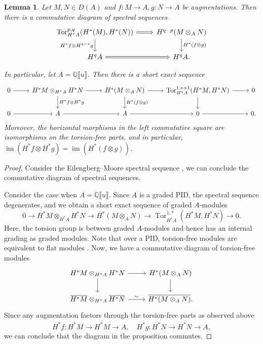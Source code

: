 \documentclass[11pt]{amsart}
\numberwithin{equation}{section}
\theoremstyle{plain}
\newtheorem{Lemma}[lemma]{Lemma}
\theoremstyle{definition}
\theoremstyle{remark}
\newcommand{\bQ} { {\mathbb{Q}}}
\newcommand{\fpw}[1]{{\llbracket #1\rrbracket}}
\newcommand\im{ {\operatorname{im}} }
\newcommand\Tor{\operatorname{Tor}}
\begin{document}
\begin{Lemma}\label{prop:eilenberg-moore}Let $M, N \in D(A)$ and $f: M \to A, g: N \to A$ be augmentations. Then there is a commutative diagram of spectral sequences
\[\begin{tikzcd}
\Tor^{p,q}_{H^*A}(H^*(M), H^*(N)) \ar[r,Rightarrow] \ar[d, "H^*f \otimes H^{q-*}g" left] & H^{q-p}(M \otimes_A N) \ar[d, "H^*(f \otimes g)"] \\
H^qA \ar[r, Rightarrow] & H^{q}A.
\end{tikzcd}\]

In particular, let $A=\bQ\fpw{u}$. Then there is a short exact sequence
\[\begin{tikzcd}
0 \ar[r] & H^*M \otimes_{H^*A} H^*N \ar[r] \ar[d,"H^*f \otimes H^*g"] & H^*(M \otimes_A N) \ar[r] \ar[d,"H^*(f \otimes g)"] & \Tor_{H^*A}^{1,*+1}(H^*M, H^*N) \ar[r] \ar[d] & 0\\
0 \ar[r] & A \ar[r] & A \ar[r] & 0 \ar[r] & 0.
\end{tikzcd}\]
Moreover, the horizontal morphisms in the left commutative square are isomorphisms on the torsion-free parts, and in particular, $\im(H^*f \otimes H^*g) = \im(H^*(f \otimes g))$.
\end{Lemma}
\begin{proof}
Consider the Eilengberg--Moore spectral sequence \cite[Chapter IV Theorem 6.1]{EKMM}, we can conclude the commutative diagram of spectral sequences. 

Consider the case when $A = \bQ\fpw{u}$. Since $A$ is a graded PID, the spectral sequence degenerates, and we obtain a short exact sequence of graded $A$-modules
\[0 \to H^*M \otimes_{H^*A} H^*N \to H^*(M \otimes_A N) \to \Tor_{H^*A}^{1,*}(H^*M, H^*N) \to 0.\]
Here, the torsion group is between graded $A$-modules and hence has an internal grading as graded modules. Note that over a PID, torsion-free modules are equivalent to flat modules \cite[Tag 0AUW]{StacksProject}. Now, we have a commutative diagram of torsion-free modules
\[\begin{tikzcd}
H^*M \otimes_{H^*A} H^*N \ar[r] \ar[d] & H^*(M \otimes_A N)\ar[d] \\
\overline{H^*M} \otimes_{H^*A} \overline{H^*N} \ar[r,"\sim"] & \overline{H^*(M \otimes_A N)}.
\end{tikzcd}\]
Since any augmentation factors through the torsion-free parts as observed above
\[H^*f: H^*M \to \overline{H^*M} \to A, \quad H^*g: H^*N \to \overline{H^*N} \to A,\] 
we can conclude that the diagram in the proposition commutes.
\end{proof}
\end{document}

